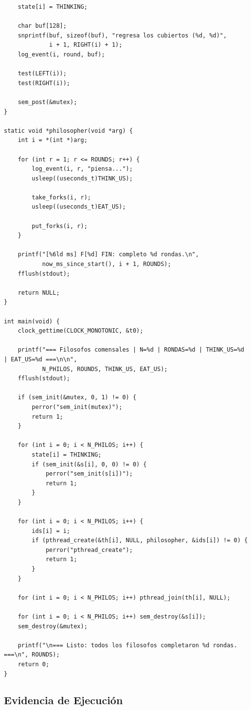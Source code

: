 \documentclass[12pt]{article}
\begin{document}
\begin{lstlisting}
    state[i] = THINKING;

    char buf[128];
    snprintf(buf, sizeof(buf), "regresa los cubiertos (%d, %d)",
             i + 1, RIGHT(i) + 1);
    log_event(i, round, buf);

    test(LEFT(i));
    test(RIGHT(i));

    sem_post(&mutex);
}

static void *philosopher(void *arg) {
    int i = *(int *)arg;

    for (int r = 1; r <= ROUNDS; r++) {
        log_event(i, r, "piensa...");
        usleep((useconds_t)THINK_US);

        take_forks(i, r);
        usleep((useconds_t)EAT_US);

        put_forks(i, r);
    }

    printf("[%6ld ms] F[%d] FIN: completo %d rondas.\n",
           now_ms_since_start(), i + 1, ROUNDS);
    fflush(stdout);

    return NULL;
}

int main(void) {
    clock_gettime(CLOCK_MONOTONIC, &t0);

    printf("=== Filosofos comensales | N=%d | RONDAS=%d | THINK_US=%d | EAT_US=%d ===\n\n",
           N_PHILOS, ROUNDS, THINK_US, EAT_US);
    fflush(stdout);

    if (sem_init(&mutex, 0, 1) != 0) {
        perror("sem_init(mutex)");
        return 1;
    }

    for (int i = 0; i < N_PHILOS; i++) {
        state[i] = THINKING;
        if (sem_init(&s[i], 0, 0) != 0) {
            perror("sem_init(s[i])");
            return 1;
        }
    }

    for (int i = 0; i < N_PHILOS; i++) {
        ids[i] = i;
        if (pthread_create(&th[i], NULL, philosopher, &ids[i]) != 0) {
            perror("pthread_create");
            return 1;
        }
    }

    for (int i = 0; i < N_PHILOS; i++) pthread_join(th[i], NULL);

    for (int i = 0; i < N_PHILOS; i++) sem_destroy(&s[i]);
    sem_destroy(&mutex);

    printf("\n=== Listo: todos los filosofos completaron %d rondas. ===\n", ROUNDS);
    return 0;
}
\end{lstlisting}

\newpage
\subsection{Evidencia de Ejecución}
\label{subsec:evidencia}
\end{document}
